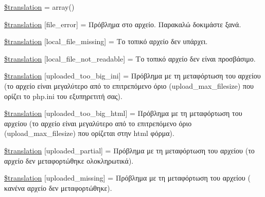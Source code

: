 \begin{DoxyCompactItemize}
\item 
\hyperlink{class_8upload_8el___g_r_8php_a1f198d410fecc3871ebdd468d343a5e3}{\$translation} = array()
\item 
\hyperlink{class_8upload_8el___g_r_8php_ac7498e49b9771b04698029aa61c70821}{\$translation} \mbox{[}\textquotesingle{}file\+\_\+error\textquotesingle{}\mbox{]} = \textquotesingle{}Πρόβλημα στο αρχείο. Παρακαλώ δοκιμάστε ξανά.\textquotesingle{}
\item 
\hyperlink{class_8upload_8el___g_r_8php_a6ec3d3a47ab70d77e7aa593e82ead10e}{\$translation} \mbox{[}\textquotesingle{}local\+\_\+file\+\_\+missing\textquotesingle{}\mbox{]} = \textquotesingle{}Το τοπικό αρχείο δεν υπάρχει.\textquotesingle{}
\item 
\hyperlink{class_8upload_8el___g_r_8php_a60104befef9b241f3a7a6a755618a4b3}{\$translation} \mbox{[}\textquotesingle{}local\+\_\+file\+\_\+not\+\_\+readable\textquotesingle{}\mbox{]} = \textquotesingle{}Το τοπικό αρχείο δεν είναι προσβάσιμο.\textquotesingle{}
\item 
\hyperlink{class_8upload_8el___g_r_8php_a6a08dcd0d3651fdd098568f6b2f0a42c}{\$translation} \mbox{[}\textquotesingle{}uploaded\+\_\+too\+\_\+big\+\_\+ini\textquotesingle{}\mbox{]} = \textquotesingle{}Πρόβλημα με τη μεταφόρτωση του αρχείου (το αρχείο είναι μεγαλύτερο από το επιτρεπόμενο όριο (upload\+\_\+max\+\_\+filesize) που ορίζει το php.\+ini του εξυπηρετιτή σας).\textquotesingle{}
\item 
\hyperlink{class_8upload_8el___g_r_8php_a623d5b8b92169f57d7e43458aa911cbb}{\$translation} \mbox{[}\textquotesingle{}uploaded\+\_\+too\+\_\+big\+\_\+html\textquotesingle{}\mbox{]} = \textquotesingle{}Πρόβλημα με τη μεταφόρτωση του αρχείου (το αρχείο είναι μεγαλύτερο από το επιτρεπόμενο όριο (upload\+\_\+max\+\_\+filesize) που ορίζεται στην html φόρμα).\textquotesingle{}
\item 
\hyperlink{class_8upload_8el___g_r_8php_a967c17da21b0a2d3bd65cca3a9ca0ea8}{\$translation} \mbox{[}\textquotesingle{}uploaded\+\_\+partial\textquotesingle{}\mbox{]} = \textquotesingle{}Πρόβλημα με τη μεταφόρτωση του αρχείου (το αρχείο δεν μεταφορτώθηκε ολοκληρωτικά).\textquotesingle{}
\item 
\hyperlink{class_8upload_8el___g_r_8php_a0cce433260be65f1f35853a6b4b8952b}{\$translation} \mbox{[}\textquotesingle{}uploaded\+\_\+missing\textquotesingle{}\mbox{]} = \textquotesingle{}Πρόβλημα με τη μεταφόρτωση του αρχείου ( κανένα αρχείο δεν μεταφορτώθηκε).\textquotesingle{}

\end{DoxyCompactItemize}
